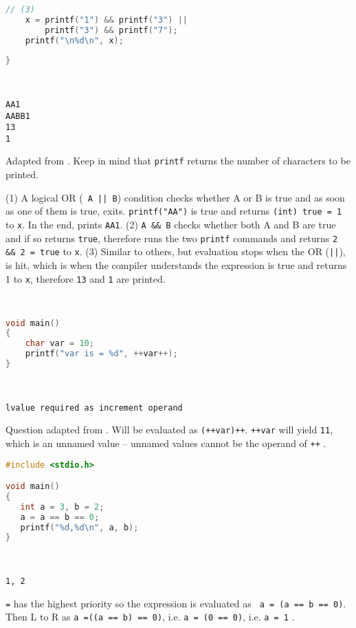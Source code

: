 \begin{exmp}
\begin{multicols}{2}
\begin{lstlisting}[language=c]
	// (3)
	x = printf("1") && printf("3") || 
		printf("3") && printf("7");
	printf("\n%d\n", x);
	
}
\end{lstlisting}


\columnbreak
\; \\
\begin{verbatim}
AA1
AABB1
13
1
\end{verbatim}

Adapted from \cite{aptitudequestions}. Keep in mind that \texttt{printf} returns the number of characters to be printed. 

(1) A logical OR (\texttt{ A || B}) condition checks whether A or B is true and as soon as one of them is true, exits. \texttt{printf("AA")} is true and returns \texttt{(int) true = 1} to \texttt{x}. In the end, prints \texttt{AA1}. (2) \texttt{A \&\& B} checks whether both A and B are true and if so returns \texttt{true}, therefore runs the two \texttt{printf} commands and returns \texttt{2 \&\& 2 = true} to \texttt{x}. (3) Similar to others, but evaluation stops when the OR (\texttt{||}), is hit, which is when the compiler understands the expression is true and returns 1 to \texttt{x}, therefore \texttt{13} and \texttt{1} are printed.
\end{multicols}



\begin{multicols}{2}


\begin{lstlisting}[language=c]


void main()
{   
	char var = 10;
	printf("var is = %d", ++var++);
}

\end{lstlisting}

\columnbreak
\; \\
\begin{verbatim}
lvalue required as increment operand
\end{verbatim}
Question adapted from \cite{aptitudequestions}. Will be evaluated as \texttt{(++var)++}. \texttt{++var} will yield \texttt{11}, which is an unnamed value -- unnamed values cannot be the operand of \texttt{++} \cite{aptitudequestions}.
\end{multicols}

\clearpage
\begin{multicols}{2}
\begin{lstlisting}[language=c]
#include <stdio.h>

void main()
{
   int a = 3, b = 2;
   a = a == b == 0;
   printf("%d,%d\n", a, b);
}
\end{lstlisting}

\columnbreak \; \\
\begin{verbatim}
1, 2
\end{verbatim}
\texttt{=} has the highest priority so the expression is evaluated as \texttt{ a = (a == b == 0)}. Then L to R as \texttt{a =((a == b) == 0)}, i.e. \texttt{a = (0 == 0)}, i.e. \texttt{a = 1} \cite{aptitudequestions}.
\end{multicols}
\end{exmp}


